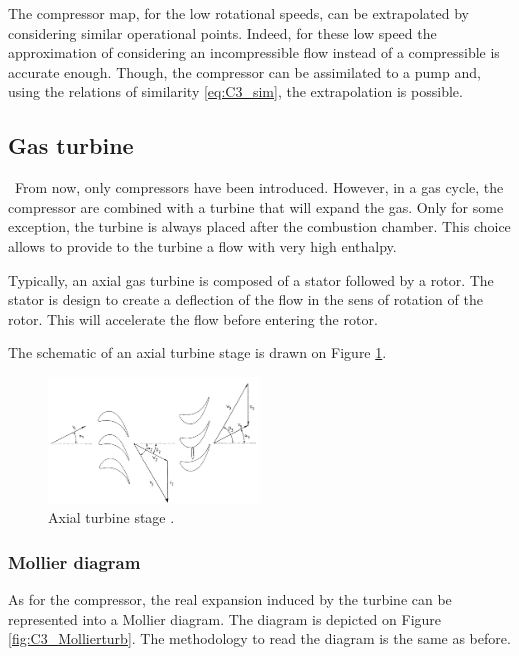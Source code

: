 The compressor map, for the low rotational speeds, can be extrapolated by considering similar operational points. Indeed, for these low speed the approximation of considering an incompressible flow instead of a compressible is accurate enough. Though, the compressor can be assimilated to a pump and, using the relations of similarity \ref{eq:C3_sim}, the extrapolation is possible.
\subsection{Gas turbine}
\quad\ From now, only compressors have been introduced. However, in a gas cycle, the compressor are combined with a turbine that will expand the gas. Only for some exception, the turbine is always placed after the combustion chamber. This choice allows to provide to the turbine a flow with very high enthalpy.

Typically, an axial gas turbine is composed of a stator followed by a rotor. The stator is design to create a deflection of the flow in the sens of rotation of the rotor. This will accelerate the flow before entering the rotor.

The schematic of an axial turbine stage is drawn on Figure \ref{fig:C3_turbstage}.
\begin{figure}[h]
    \centering
    \includegraphics[width=0.5\textwidth]{Turb_stage.png}
    \caption{Axial turbine stage \cite{Hillewaert2019}.}
    \label{fig:C3_turbstage}
\end{figure}

\subsubsection{Mollier diagram}
As for the compressor, the real expansion induced by the turbine can be represented into a Mollier diagram. The diagram is depicted on Figure \ref{fig:C3_Mollierturb}. The methodology to read the diagram is the same as before.


